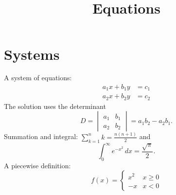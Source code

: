 \documentclass{article}
\title{Equations}
\begin{document}
\maketitle
\section{Systems}
A system of equations:
\begin{align}
  a_1 x + b_1 y &= c_1 \label{eq:first}\\
  a_2 x + b_2 y &= c_2
\end{align}
The solution uses the determinant
\[
  D = \begin{vmatrix} a_1 & b_1 \\ a_2 & b_2 \end{vmatrix} = a_1 b_2 - a_2 b_1 .
\]
Summation and integral: $\sum_{k=1}^{n} k = \frac{n(n+1)}{2}$ and
\begin{equation}
  \int_0^\infty e^{-x^2}\,dx = \frac{\sqrt{\pi}}{2}.
\end{equation}
A piecewise definition:
\begin{equation}
  f(x) = \begin{cases} x^2 & x \ge 0 \\ -x & x < 0 \end{cases}
\end{equation}
\end{document}
